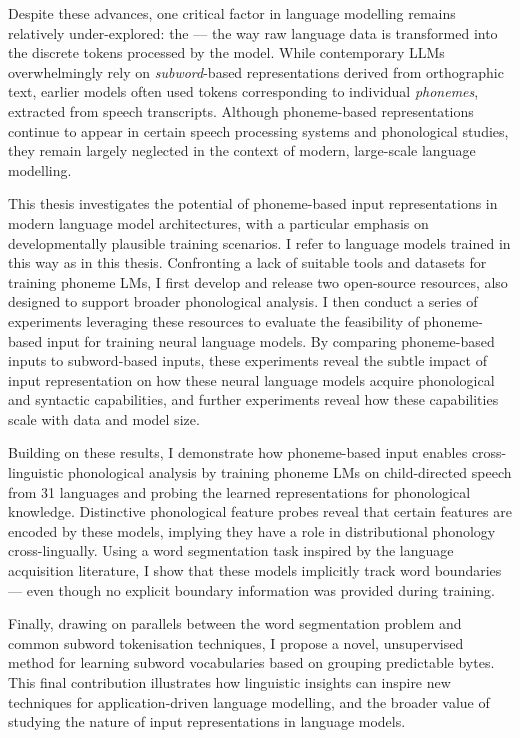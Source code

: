 Despite these advances, one critical factor in language modelling remains relatively under-explored: the  --- the way raw language data is transformed into the discrete tokens processed by the model. While contemporary LLMs overwhelmingly rely on \emph{subword}-based representations derived from orthographic text, earlier \ngram models often used tokens corresponding to individual \emph{phonemes}, extracted from speech transcripts. Although phoneme-based representations continue to appear in certain speech processing systems and phonological studies, they remain largely neglected in the context of modern, large-scale language modelling.

This thesis investigates the potential of phoneme-based input representations in modern language model architectures, with a particular emphasis on developmentally plausible training scenarios. I refer to language models trained in this way as  in this thesis. Confronting a lack of suitable tools and datasets for training phoneme LMs, I first develop and release two open-source resources, also designed to support broader phonological analysis. I then conduct a series of experiments leveraging these resources to evaluate the feasibility of phoneme-based input for training neural language models. By comparing phoneme-based inputs to subword-based inputs, these experiments reveal the subtle impact of input representation on how these neural language models acquire phonological and syntactic capabilities, and further experiments reveal how these capabilities scale with data and model size.

Building on these results, I demonstrate how phoneme-based input enables cross-linguistic phonological analysis by training phoneme LMs on child-directed speech from 31 languages and probing the learned representations for phonological knowledge. Distinctive phonological feature probes reveal that certain features are encoded by these models, implying they have a role in distributional phonology cross-lingually. Using a word segmentation task inspired by the language acquisition literature, I show that these models implicitly track word boundaries --- even though no explicit boundary information was provided during training.

Finally, drawing on parallels between the word segmentation problem and common subword tokenisation techniques, I propose a novel, unsupervised method for learning subword vocabularies based on grouping predictable bytes. This final contribution illustrates how linguistic insights can inspire new techniques for application-driven language modelling, and the broader value of studying the nature of input representations in language models.

